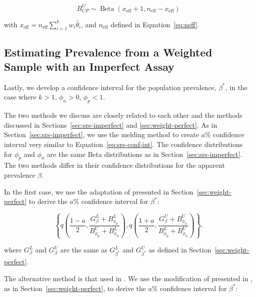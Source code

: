 \documentclass[AMA,STIX1COL]{WileyNJD-v2}
\begin{document}
\begin{equation}
    B^U_{CP} \sim \operatorname{Beta}\left(x_{\text{eff}} + 1, n_{\text{eff}} - x_{\text{eff}} \right)
\end{equation}

with \( x_{\text{eff}} = n_{\text{eff}} \sum_{i=1}^k w_i \hat{\theta}_i \), and \( n_{\text{eff}} \) defined in Equation~\ref{eq:neff}.

\subsection{Estimating Prevalence from a Weighted Sample with an Imperfect Assay}
\label{sec:weight-imperfect}

Lastly, we develop a confidence interval for the population prevalence, \( \beta^* \), in the case where \( k > 1 \), \( \phi_n > 0 \), \( \phi_p < 1 \).

The two methods we discuss are closely related to each other and the methods discussed in Sections~\ref{sec:srs-imperfect} and \ref{sec:weight-perfect}.
As in Section~\ref{sec:srs-imperfect}, we use the melding method \cite{FayP:2015} to create \( a \)\% confidence interval very similar to Equation~\ref{eq:srs-conf-int}.
The confidence distributions for \( \phi_p \) and \( \phi_n \) are the same Beta distributions as in Section~\ref{sec:srs-imperfect}.
The two methods differ in their confidence distributions for the apparent prevalence \( \beta \).

In the first case, we use the adaptation of \cite{FayF:1997} presented in Section~\ref{sec:weight-perfect} to derive the \( a \)\% confidence interval for \( \beta^* \):

\begin{equation}
    \left\{ q \left( \frac{1 - a}{2}, \frac{G_{\beta}^L + B_{\phi_n}^L }{B_{\phi_p}^U + B_{\phi_n}^L }  \right),  q \left( \frac{1 + a}{2}, \frac{G_{\beta}^U + B_{\phi_n}^U}{B_{\phi_p}^L + B_{\phi_n}^U}  \right) \right\}.
\end{equation}

where \( G_{\beta}^L \) and \( G_{\beta}^U \) are the same as \( G_{\beta^*}^L \) and \( G_{\beta^*}^U \) as defined in Section~\ref{sec:weight-perfect}.

The alternative method is that used in \cite{Kali:2021}.
We use the  modification of \cite{Korn:1998} presented in \cite{Dean:2015}, as in Section~\ref{sec:weight-perfect}, to derive the \( a \)\% confidence interval for \( \beta^* \):
\end{document}
